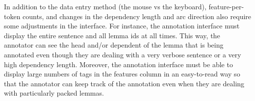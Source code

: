 In addition to the data entry method (the mouse vs the keyboard), feature-per-token counts, and changes in the dependency length and arc direction also require some adjustments in the interface.
For instance, the annotation interface must display the entire sentence and all lemma ids at all times.
This way, the annotator can see the head and/or dependent of the lemma that is being annotated even though they are dealing with a very verbose sentence or a very high dependency length.
Moreover, the annotation interface must be able to display large numbers of tags in the features column in an easy-to-read way so that the annotator can keep track of the annotation even when they are dealing with particularly packed lemmas.










